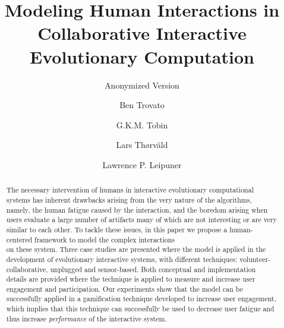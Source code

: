 \documentclass[sigconf]{acmart}
\begin{document}
\title{Modeling Human Interactions in Collaborative Interactive 
 Evolutionary Computation}
\subtitle{Anonymized Version}


\author{Ben Trovato}

\author{G.K.M. Tobin}

\author{Lars Th{\o}rv{\"a}ld}

\author{Lawrence P. Leipuner}



\begin{abstract}
The necessary intervention of humans in interactive evolutionary
computational systems has inherent drawbacks arising from the very nature of 
the algorithms, namely, the human fatigue caused by the interaction, and
the boredom arising when users evaluate a large number of artifacts 
many of which are not interesting or are very similar to each other.
To tackle these issues, in this paper we
propose a human-centered framework to model 
the complex interactions  \\on these system.
Three case studies are presented where the model is applied in the 
development of evolutionary interactive systems, with different techniques:
volunteer-collaborative, unplugged and sensor-based. 
Both conceptual and implementation details are provided where the   
technique is applied to measure and increase user engagement and participation.
Our experiments show that the model can be successfully applied in a
gamification technique developed to increase user engagement, which
implies that this technique can successfully be used to 
decrease user fatigue and thus increase {\em performance} of the
interactive system.
\end{abstract}
\end{document}
